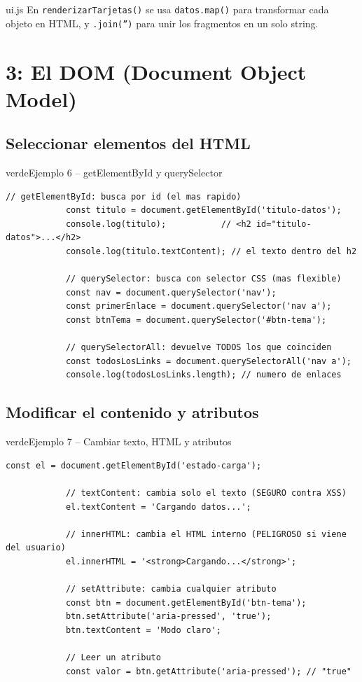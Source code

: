 \documentclass[11pt,a4paper]{article}
\begin{document}
	\begin{cajapractica}{ui.js}
		En \texttt{renderizarTarjetas()} se usa \texttt{datos.map()} para transformar cada objeto en HTML, y \texttt{.join('')} para unir los fragmentos en un solo string.
	\end{cajapractica}
	
	\section{3: El DOM (Document Object Model)}
	
	\subsection{Seleccionar elementos del HTML}
	
	\begin{cajacodigo}{verde}{Ejemplo 6 -- getElementById y querySelector}
		\begin{lstlisting}[style=codejs]
			// getElementById: busca por id (el mas rapido)
			const titulo = document.getElementById('titulo-datos');
			console.log(titulo);           // <h2 id="titulo-datos">...</h2>
			console.log(titulo.textContent); // el texto dentro del h2
			
			// querySelector: busca con selector CSS (mas flexible)
			const nav = document.querySelector('nav');
			const primerEnlace = document.querySelector('nav a');
			const btnTema = document.querySelector('#btn-tema');
			
			// querySelectorAll: devuelve TODOS los que coinciden
			const todosLosLinks = document.querySelectorAll('nav a');
			console.log(todosLosLinks.length); // numero de enlaces
		\end{lstlisting}
	\end{cajacodigo}
	
	\subsection{Modificar el contenido y atributos}
	
	\begin{cajacodigo}{verde}{Ejemplo 7 -- Cambiar texto, HTML y atributos}
		\begin{lstlisting}[style=codejs]
			const el = document.getElementById('estado-carga');
			
			// textContent: cambia solo el texto (SEGURO contra XSS)
			el.textContent = 'Cargando datos...';
			
			// innerHTML: cambia el HTML interno (PELIGROSO si viene del usuario)
			el.innerHTML = '<strong>Cargando...</strong>';
			
			// setAttribute: cambia cualquier atributo
			const btn = document.getElementById('btn-tema');
			btn.setAttribute('aria-pressed', 'true');
			btn.textContent = 'Modo claro';
			
			// Leer un atributo
			const valor = btn.getAttribute('aria-pressed'); // "true"
		\end{lstlisting}
	\end{cajacodigo}
	
\end{document}
